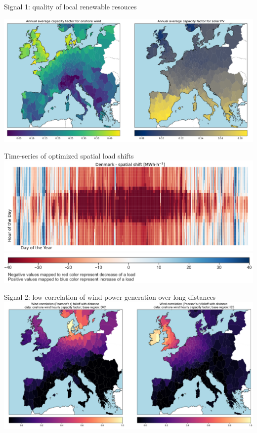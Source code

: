 \begin{frame}{Signal 1: quality of local renewable resouces}

  \centering
  \vspace{0.3cm}
  \includegraphics[width=14cm]{images/results-1.png}

\end{frame}


\begin{frame}{Time-series of optimized spatial load shifts}
	\centering
	\vspace{0.5cm}
	\includegraphics[width=14cm]{images/results-3.png}
	\includegraphics[width=13.5cm]{images/results-9c.png}
  \end{frame}

\begin{frame}{Signal 2: low correlation of wind power generation over long distances}
  \centering
  \vspace{0.3cm}
  \includegraphics[width=14cm]{images/results-4.png}
\end{frame}


